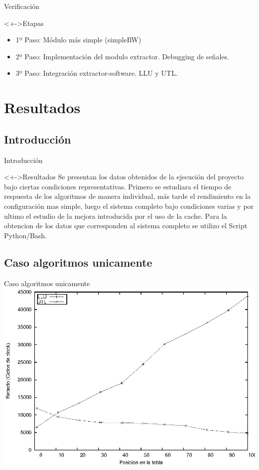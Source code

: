 \documentclass[xcolor=dvipsnames]{beamer}
\begin{document}
\begin{frame}{Verificación}
\begin{block}<+->{Etapas}   
    \begin{itemize}
      \scriptsize
     	\item 1º Paso: Módulo más simple (simpleRW)
     	\item 2º Paso: Implementación del modulo extractor. Debugging de señales.
     	\item 3º Paso: Integración extractor-software. LLU y UTL.
    \end{itemize}
  \end{block}
\end{frame}



\section{Resultados}
\subsection{Introducción}
\begin{frame}{Introducción}
	  \begin{block}<+->{Resultados}  
	\center 
	Se presentan los datos obtenidos de la ejecución del proyecto bajo ciertas condiciones representativas. Primero se estudiara el tiempo de 	respuesta de los algoritmos de manera individual, más tarde el rendimiento en la configuración mas simple, luego el sistema completo bajo condiciones 	varias y por ultimo el estudio de la mejora introducida por el uso de la cache. Para la obtencion de los datos que corresponden al sistema completo se utilizo el Script Python/Bash.
  \end{block}

\end{frame}

\subsection{Caso algoritmos unicamente}
\begin{frame}{Caso algoritmos unicamente} 
\center	
\includegraphics[scale=0.70]{figures/llu-utlsof.eps} 
\end{frame}
\end{document}
